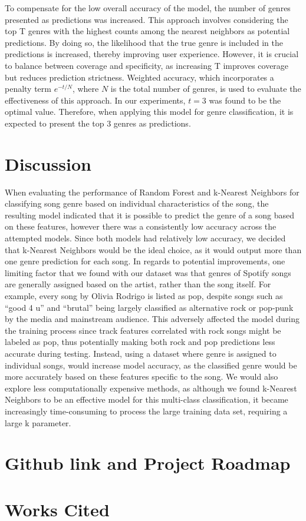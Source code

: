 \documentclass[times, twocolumn]{article}
\begin{document}
To compensate for the low overall accuracy of the model, the number of genres presented as predictions was increased. This approach involves considering the top T genres with the highest counts among the nearest neighbors as potential predictions. By doing so, the likelihood that the true genre is included in the predictions is increased, thereby improving user experience. However, it is crucial to balance between coverage and specificity, as increasing T improves coverage but reduces prediction strictness. Weighted accuracy, which incorporates a penalty term $e^{-t/N}$, where $N$ is the total number of genres, is used to evaluate the effectiveness of this approach. In our experiments, $t=3$ was found to be the optimal value. Therefore, when applying this model for genre classification, it is expected to present the top 3 genres as predictions.

\section{Discussion}
When evaluating the performance of Random Forest and k-Nearest Neighbors for classifying song genre based on individual characteristics of the song, the resulting model indicated that it is possible to predict the genre of a song based on these features, however there was a consistently low accuracy across the attempted models. Since both models had relatively low accuracy, we decided that k-Nearest Neighbors would be the ideal choice, as it would output more than one genre prediction for each song. In regards to potential improvements, one limiting factor that we found with our dataset was that genres of Spotify songs are generally assigned based on the artist, rather than the song itself. For example, every song by Olivia Rodrigo is listed as pop, despite songs such as “good 4 u” and “brutal” being largely classified as alternative rock or pop-punk by the media and mainstream audience. This adversely affected the model during the training process since track features correlated with rock songs might be labeled as pop, thus potentially making both rock and pop predictions less accurate during testing. Instead, using a dataset where genre is assigned to individual songs, would increase model accuracy, as the classified genre would be more accurately based on these features specific to the song. We would also explore less computationally expensive methods, as although we found k-Nearest Neighbors to be an effective model for this multi-class classification, it became increasingly time-consuming to process the large training data set, requiring a large k parameter. 

\section{Github link and Project Roadmap}

\section{Works Cited}
\printbibliography
\end{document}
